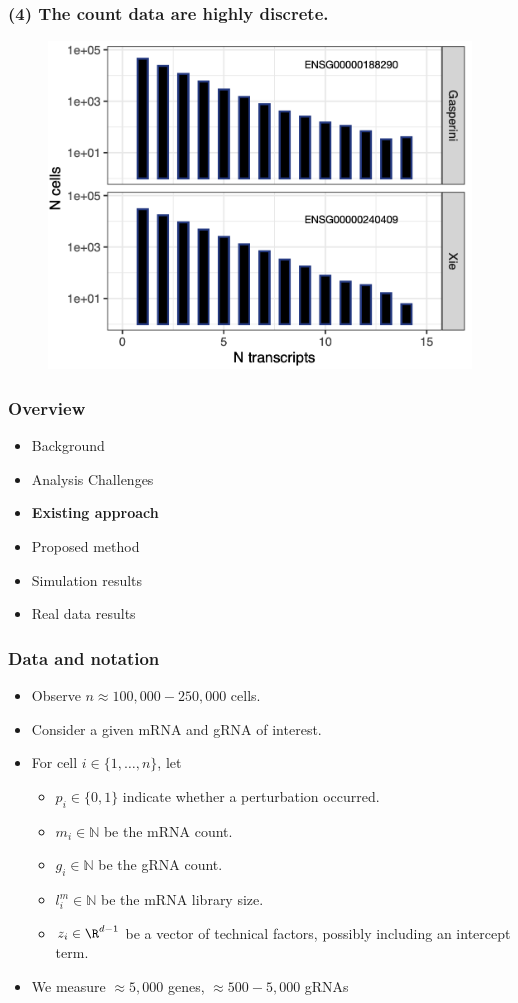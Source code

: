 \documentclass{beamer}
\begin{document}
\begin{frame}
\frametitle{(4) The count data are highly discrete.}
\begin{figure}
	\centering
	\includegraphics[width=0.75\linewidth]{../figures/fig1/mRNA_count_hist_annotated.png}
\end{figure}
\end{frame}


\begin{frame}
\frametitle{Overview}
\begin{itemize}
	\item Background
	\item Analysis Challenges
	\item \textbf{Existing approach}
	\item Proposed method
	\item Simulation results
	\item Real data results
\end{itemize}
\end{frame}


\begin{frame}
\frametitle{Data and notation}

\begin{itemize}
\item Observe $n \approx 100,000 - 250,000$ cells.
\item Consider a given mRNA and gRNA of interest.
\item For cell $i \in \{1, \dots, n\}$, let 
\begin{itemize}
\item $p_i \in \{0, 1\}$ indicate whether a perturbation occurred. 
\item $m_i \in \mathbb{N}$ be the mRNA count.
\item $g_i \in \mathbb{N}$ be the gRNA count.
\item $l^m_i \in \mathbb{N}$ be the mRNA library size.
\item $z_i \in \R^{d-1}$ be a vector of technical factors, possibly including an intercept term.
\end{itemize}
\item We measure $\approx5,000$ genes, $\approx500 - 5,000$ gRNAs
\end{itemize}
\end{frame}
\end{document}
